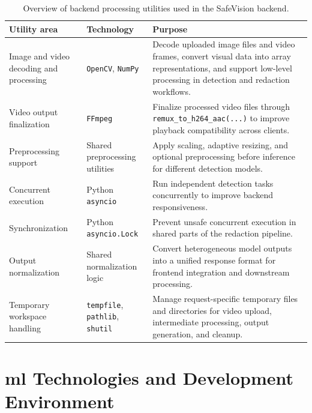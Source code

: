 \begin{table}[H]
\centering
\renewcommand{\arraystretch}{1.5}
\begin{tabular}{p{3.2cm} p{3.5cm} p{7cm}}
\toprule
\textbf{Utility area} & \textbf{Technology} & \textbf{Purpose} \\
\midrule
Image and video decoding and processing & \texttt{OpenCV}, \texttt{NumPy} & Decode uploaded image files and video frames, convert visual data into array representations, and support low-level processing in detection and redaction workflows. \\

Video output finalization & \texttt{FFmpeg} & Finalize processed video files through \texttt{remux\_to\_h264\_aac(...)} to improve playback compatibility across clients. \\

Preprocessing support & Shared preprocessing utilities & Apply scaling, adaptive resizing, and optional preprocessing before \gls{inference} for different detection models. \\

Concurrent execution & Python \texttt{asyncio} & Run independent detection tasks concurrently to improve backend responsiveness. \\

Synchronization & Python \texttt{asyncio.Lock} & Prevent unsafe concurrent execution in shared parts of the redaction pipeline. \\

Output normalization & Shared normalization logic & Convert heterogeneous model outputs into a unified response format for frontend integration and downstream processing. \\

Temporary workspace handling & \texttt{tempfile}, \texttt{pathlib}, \texttt{shutil} & Manage request-specific temporary files and directories for video upload, intermediate processing, output generation, and cleanup. \\
\bottomrule
\end{tabular}
\caption{Overview of backend processing utilities used in the \gls{SafeVision} backend.}
\label{tab:backend_processing_utilities}
\end{table}



\section{\acrshort{ml} Technologies and Development Environment}

